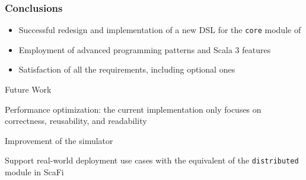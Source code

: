 \begin{frame}
    \frametitle{Conclusions}
    \begin{itemize}
        \item Successful redesign and implementation of a new \ac{DSL} for the \texttt{core} module of \this
        \item Employment of advanced programming patterns and Scala 3 features
        \item Satisfaction of all the requirements, including optional ones
    \end{itemize}
    \begin{blockitems}{Future Work}
        \item Performance optimization: the current implementation only focuses on correctness, reusability, and readability
        \item Improvement of the simulator
        \item Support real-world deployment use cases with the equivalent of the \texttt{distributed} module in ScaFi
    \end{blockitems}
\end{frame}
